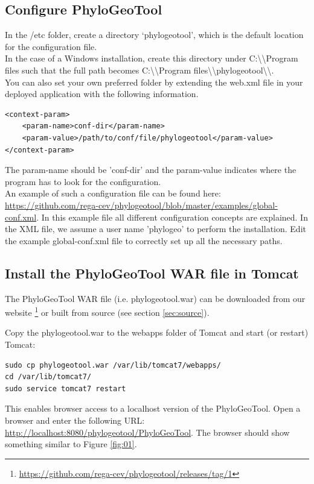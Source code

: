 \documentclass[a4paper, 11pt]{article} %
\begin{document}
\subsection{Configure PhyloGeoTool} \label{sssec:config_file}

In the /etc folder, create a directory `phylogeotool', which is the default location for the configuration file. 
\\
In the case of a Windows installation, create this directory under C:\textbackslash \textbackslash Program files such that the full path becomes C:\textbackslash \textbackslash Program files\textbackslash \textbackslash phylogeotool\textbackslash \textbackslash.
\\
You can also set your own preferred folder by extending the web.xml file in your deployed application with the following information.

\begin{verbatim}
<context-param>
    <param-name>conf-dir</param-name>
    <param-value>/path/to/conf/file/phylogeotool</param-value>
</context-param>
\end{verbatim}

The param-name should be 'conf-dir' and the param-value indicates where the program has to look for the configuration.
\\
An example of such a configuration file can be found here: \url{https://github.com/rega-cev/phylogeotool/blob/master/examples/global-conf.xml}. In this example file all different configuration concepts are explained.
In the XML file, we assume a user name 'phylogeo' to perform the installation.
Edit the example global-conf.xml file to correctly set up all the necessary paths.


\subsection{Install the PhyloGeoTool WAR file in Tomcat}
The PhyloGeoTool WAR file (i.e. phylogeotool.war) can be downloaded from our website \footnote{\url{https://github.com/rega-cev/phylogeotool/releases/tag/1}} or built from source (see section \ref{sec:source}). 

Copy the phylogeotool.war to the webapps folder of Tomcat and start (or restart) Tomcat:
\begin{verbatim}
sudo cp phylogeotool.war /var/lib/tomcat7/webapps/
cd /var/lib/tomcat7/
sudo service tomcat7 restart
\end{verbatim}
This enables browser access to a localhost version of the PhyloGeoTool.
Open a browser and enter the following URL: \url{http://localhost:8080/phylogeotool/PhyloGeoTool}.
The browser should show something similar to Figure \ref{fig:01}.
\end{document}
